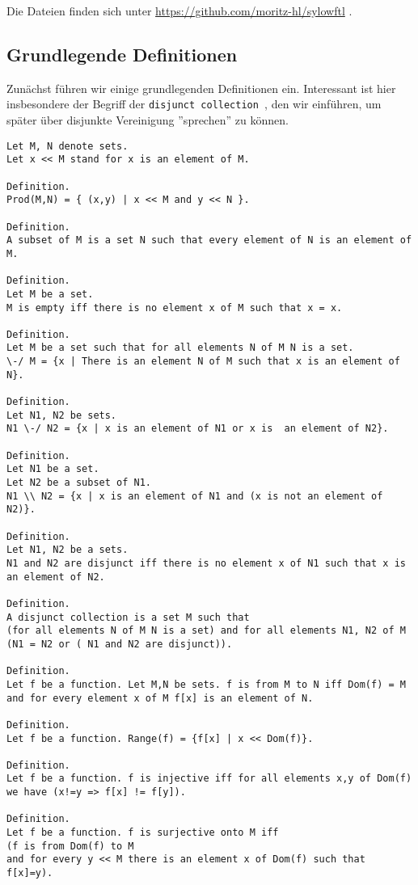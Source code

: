 \documentclass[a4paper,12pt]{scrartcl}
\begin{document}
Die Dateien finden sich unter \url{https://github.com/moritz-hl/sylowftl} \cite{bibtex.g}.

\subsection{Grundlegende Definitionen}

Zunächst führen wir einige grundlegenden Definitionen ein.
Interessant ist hier insbesondere der Begriff der \verb!disjunct collection !, den wir einführen, um später über disjunkte Vereinigung ''sprechen'' zu können.

\begin{lstlisting}
Let M, N denote sets.
Let x << M stand for x is an element of M.

Definition.
Prod(M,N) = { (x,y) | x << M and y << N }.

Definition.
A subset of M is a set N such that every element of N is an element of M.

Definition.
Let M be a set.
M is empty iff there is no element x of M such that x = x.

Definition.
Let M be a set such that for all elements N of M N is a set.
\-/ M = {x | There is an element N of M such that x is an element of N}.

Definition.
Let N1, N2 be sets.
N1 \-/ N2 = {x | x is an element of N1 or x is  an element of N2}.

Definition.
Let N1 be a set.
Let N2 be a subset of N1.
N1 \\ N2 = {x | x is an element of N1 and (x is not an element of N2)}.

Definition.
Let N1, N2 be a sets.
N1 and N2 are disjunct iff there is no element x of N1 such that x is an element of N2.

Definition.
A disjunct collection is a set M such that 
(for all elements N of M N is a set) and for all elements N1, N2 of M (N1 = N2 or ( N1 and N2 are disjunct)).

Definition.
Let f be a function. Let M,N be sets. f is from M to N iff Dom(f) = M and for every element x of M f[x] is an element of N.

Definition.
Let f be a function. Range(f) = {f[x] | x << Dom(f)}.

Definition.
Let f be a function. f is injective iff for all elements x,y of Dom(f) we have (x!=y => f[x] != f[y]).

Definition.
Let f be a function. f is surjective onto M iff 
(f is from Dom(f) to M 
and for every y << M there is an element x of Dom(f) such that f[x]=y).
\end{lstlisting}
\end{document}

